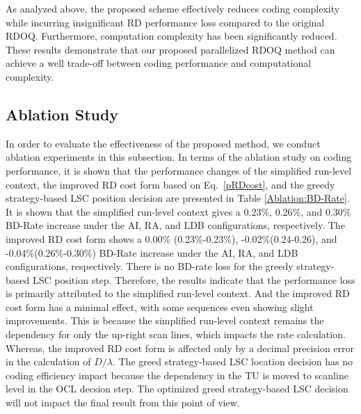 \documentclass[lettersize,journal]{IEEEtran}
\begin{document}
As analyzed above, the proposed scheme effectively reduces coding complexity while incurring insignificant RD performance loss compared to the original RDOQ. Furthermore, computation complexity has been significantly reduced. These results demonstrate that our proposed parallelized RDOQ method can achieve a well trade-off between coding performance and computational complexity. 

\subsection{Ablation Study}
In order to evaluate the effectiveness of the proposed method, we conduct ablation experiments in this subsection. In terms of the ablation study on coding performance, it is shown that the performance changes of the simplified run-level context, the improved RD cost form based on Eq.~\eqref{pRDcost}, and the greedy strategy-based LSC position decision are presented in Table \ref{Ablation:BD-Rate}. It is shown that the simplified run-level context gives a 0.23\%, 0.26\%, and 0.30\% BD-Rate increase under the AI, RA, and LDB configurations, respectively. The improved RD cost form shows a 0.00\% (0.23\%-0.23\%), -0.02\%(0.24-0.26), and -0.04\%(0.26\%-0.30\%) BD-Rate increase under the AI, RA, and LDB configurations, respectively. There is no BD-rate loss for the greedy strategy-based LSC position step. Therefore, the results indicate that the performance loss is primarily attributed to the simplified run-level context. And the improved RD cost form has a minimal effect, with some sequences even showing slight improvements. This is because the simplified run-level context remains the dependency for only the up-right scan lines, which impacts the rate calculation. Whereas, the improved RD cost form is affected only by a decimal precision error in the calculation of $D/\lambda$. The greed strategy-based LSC location decision has no coding efficiency impact because the dependency in the TU is moved to scanline level in the OCL decsion step. The optimized greed strategy-based LSC decision will not impact the final result from this point of view. 
\end{document}
